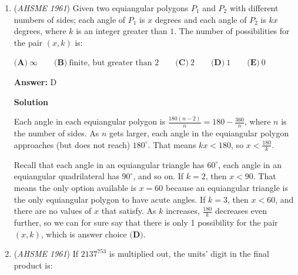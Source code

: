 \begin{enumerate}
 



\textbf{Solution 2}

Same as solution 1 but faster.

 Theory:In an AP, we can write$S_n = An^2+Bn$, where common difference($d) = 2A$ and first term($a) = A(1^2)+B(1) = A+B$ 

 This is already known, and not part of the solution :) .

 So, given:

 $S_{50} = 2500A+50B=200$
$S_{100} - S_{50} = 7500A+50B=2700$
$\implies A=0.5 \text{ and } B = -21$
$\implies \text{first term} = A+B = \boxed{\textbf{ -20.5 (C) }}$



	\item (\textit{AHSME 1961}) Given two equiangular polygons $P_1$ and $P_2$ with different numbers of sides; 
each angle of $P_1$ is $x$ degrees and each angle of $P_2$ is $kx$ degrees, 
where $k$ is an integer greater than $1$. 
The number of possibilities for the pair $(x, k)$ is:


 $\textbf{(A)}\ \infty\qquad \textbf{(B)}\ \text{finite, but greater than 2}\qquad \textbf{(C)}\ 2\qquad \textbf{(D)}\ 1\qquad \textbf{(E)}\ 0$

 \textbf{Answer: }D



\textbf{Solution}

Each angle in each equiangular polygon is $\frac{180(n-2)}{n} = 180 - \frac{360}{n}$, where $n$ is the number of sides.  As $n$ gets larger, each angle in the equiangular polygon approaches (but does not reach) $180^{\circ}$.  That means $kx < 180$, so $x < \frac{180}{k}$.

Recall that each angle in an equiangular triangle has $60^{\circ}$, each angle in an equiangular quadrilateral has $90^{\circ}$, and so on.  If $k = 2$, then $x < 90$.  That means the only option available is $x = 60$ because an equiangular triangle is the only equiangular polygon to have acute angles.  If $k = 3$, then $x < 60$, and there are no values of $x$ that satisfy.  As $k$ increases, $\frac{180}{k}$ decreases even further, so we can for sure say that there is only 1 possibility for the pair $(x, k)$, which is answer choice $\boxed{\textbf{(D)}}$.

 


	\item (\textit{AHSME 1961}) If $2137^{753}$ is multiplied out, the units' digit in the final product is:



\end{enumerate}
